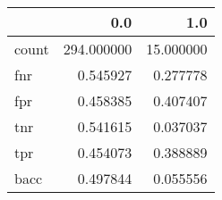 \begin{tabular}{lrr}
\toprule
{} &         0.0 &        1.0 \\
\midrule
count &  294.000000 &  15.000000 \\
fnr   &    0.545927 &   0.277778 \\
fpr   &    0.458385 &   0.407407 \\
tnr   &    0.541615 &   0.037037 \\
tpr   &    0.454073 &   0.388889 \\
bacc  &    0.497844 &   0.055556 \\
\bottomrule
\end{tabular}
